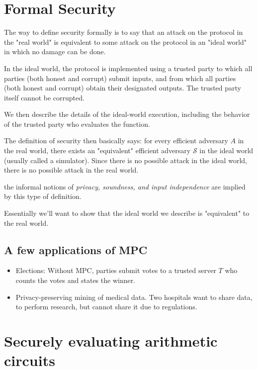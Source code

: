 \section{Formal Security}
The way to define security formally is to say that an attack on the protocol in 
the "real world" 
is equivalent to some attack on the protocol in an "ideal world" in which 
no damage can be done.

In the ideal world, the protocol is implemented using a trusted 
party to which all parties (both honest and corrupt) submit inputs, 
and from which all parties (both honest and corrupt) obtain their designated outputs. 
The trusted party itself cannot be corrupted.

We then describe the details of the ideal-world execution, including the 
behavior of the trusted party who evaluates the function.

The definition of security then basically says: for every efficient adversary $A$ 
in the real world, there exists an "equivalent" efficient 
adversary $\mathcal{S}$ in the ideal world (usually called a simulator).
Since there is no possible attack in the ideal world, 
there is no possible attack in the real world.

the informal notions of \emph{privacy, soundness, and input independence} are
 implied by this type of definition.

 Essentially we'll want to show that the ideal world we describe is 
 "equivalent" to the real world.

 \subsection{A few applications of MPC}
 \begin{itemize}
  \item Elections: Without MPC, parties submit votes to a trusted server $T$ who 
  counts the votes and states the winner.
  \item Privacy-preserving mining of medical data. Two hospitals want to share data,
  to perform research, but cannot share it due to regulations.

 \end{itemize}

\section{Securely evaluating arithmetic circuits}

